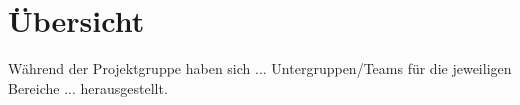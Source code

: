 \section{Übersicht}

Während der Projektgruppe haben sich ... Untergruppen/Teams für die jeweiligen Bereiche ... herausgestellt.